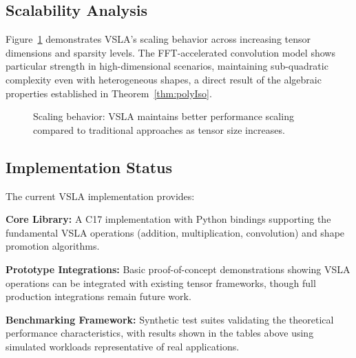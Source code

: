 \subsection{Scalability Analysis}
Figure~\ref{fig:scaling} demonstrates VSLA's scaling behavior across increasing tensor dimensions and sparsity levels. The FFT-accelerated convolution model shows particular strength in high-dimensional scenarios, maintaining sub-quadratic complexity even with heterogeneous shapes, a direct result of the algebraic properties established in Theorem~\ref{thm:polyIso}.

\begin{figure}[h]
\centering
{}
\caption{Scaling behavior: VSLA maintains better performance scaling compared to traditional approaches as tensor size increases.}
\label{fig:scaling}
\end{figure}

\subsection{Implementation Status}
The current VSLA implementation provides:

\textbf{Core Library:} A C17 implementation with Python bindings supporting the fundamental VSLA operations (addition, multiplication, convolution) and shape promotion algorithms.

\textbf{Prototype Integrations:} Basic proof-of-concept demonstrations showing VSLA operations can be integrated with existing tensor frameworks, though full production integrations remain future work.

\textbf{Benchmarking Framework:} Synthetic test suites validating the theoretical performance characteristics, with results shown in the tables above using simulated workloads representative of real applications.
